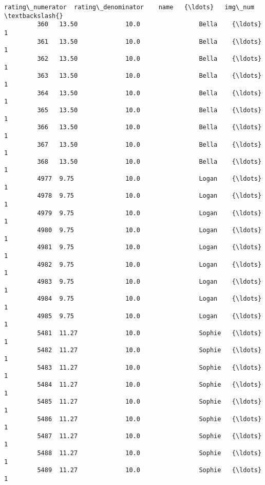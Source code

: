 \documentclass[11pt]{article}
\begin{document}
\begin{Verbatim}[commandchars=\\\{\}]
               rating\_numerator  rating\_denominator    name   {\ldots}   img\_num  \textbackslash{}
         360   13.50             10.0                Bella    {\ldots}    1        
         361   13.50             10.0                Bella    {\ldots}    1        
         362   13.50             10.0                Bella    {\ldots}    1        
         363   13.50             10.0                Bella    {\ldots}    1        
         364   13.50             10.0                Bella    {\ldots}    1        
         365   13.50             10.0                Bella    {\ldots}    1        
         366   13.50             10.0                Bella    {\ldots}    1        
         367   13.50             10.0                Bella    {\ldots}    1        
         368   13.50             10.0                Bella    {\ldots}    1        
         4977  9.75              10.0                Logan    {\ldots}    1        
         4978  9.75              10.0                Logan    {\ldots}    1        
         4979  9.75              10.0                Logan    {\ldots}    1        
         4980  9.75              10.0                Logan    {\ldots}    1        
         4981  9.75              10.0                Logan    {\ldots}    1        
         4982  9.75              10.0                Logan    {\ldots}    1        
         4983  9.75              10.0                Logan    {\ldots}    1        
         4984  9.75              10.0                Logan    {\ldots}    1        
         4985  9.75              10.0                Logan    {\ldots}    1        
         5481  11.27             10.0                Sophie   {\ldots}    1        
         5482  11.27             10.0                Sophie   {\ldots}    1        
         5483  11.27             10.0                Sophie   {\ldots}    1        
         5484  11.27             10.0                Sophie   {\ldots}    1        
         5485  11.27             10.0                Sophie   {\ldots}    1        
         5486  11.27             10.0                Sophie   {\ldots}    1        
         5487  11.27             10.0                Sophie   {\ldots}    1        
         5488  11.27             10.0                Sophie   {\ldots}    1        
         5489  11.27             10.0                Sophie   {\ldots}    1        
         

\end{Verbatim}
\end{document}
